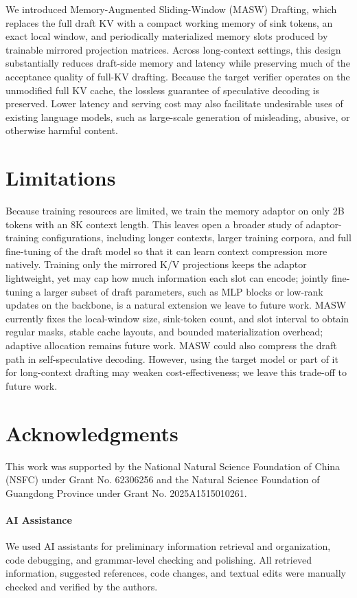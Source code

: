 We introduced Memory-Augmented Sliding-Window (MASW) Drafting, which replaces the full draft KV with a compact working memory of sink tokens, an exact local window, and periodically materialized memory slots produced by trainable mirrored projection matrices.
Across long-context settings, this design substantially reduces draft-side memory and latency while preserving much of the acceptance quality of full-KV drafting.
Because the target verifier operates on the unmodified full KV cache, the lossless guarantee of speculative decoding is preserved.
Lower latency and serving cost may also facilitate undesirable uses of existing language models, such as large-scale generation of misleading, abusive, or otherwise harmful content.

\section*{Limitations}

Because training resources are limited, we train the memory adaptor on only 2B tokens with an 8K context length. This leaves open a broader study of adaptor-training configurations, including longer contexts, larger training corpora, and full fine-tuning of the draft model so that it can learn context compression more natively.
Training only the mirrored K/V projections keeps the adaptor lightweight, yet may cap how much information each slot can encode; jointly fine-tuning a larger subset of draft parameters, such as MLP blocks or low-rank updates on the backbone, is a natural extension we leave to future work.
MASW currently fixes the local-window size, sink-token count, and slot interval to obtain regular masks, stable cache layouts, and bounded materialization overhead; adaptive allocation remains future work.
MASW could also compress the draft path in self-speculative decoding. However, using the target model or part of it for long-context drafting may weaken cost-effectiveness; we leave this trade-off to future work.

\section*{Acknowledgments}

This work was supported by the National Natural Science Foundation of China (NSFC) under Grant No. 62306256 and the Natural Science Foundation of Guangdong Province under Grant No. 2025A1515010261.

\paragraph{AI Assistance}

We used AI assistants for preliminary information retrieval and organization, code debugging, and grammar-level checking and polishing.
All retrieved information, suggested references, code changes, and textual edits were manually checked and verified by the authors.
